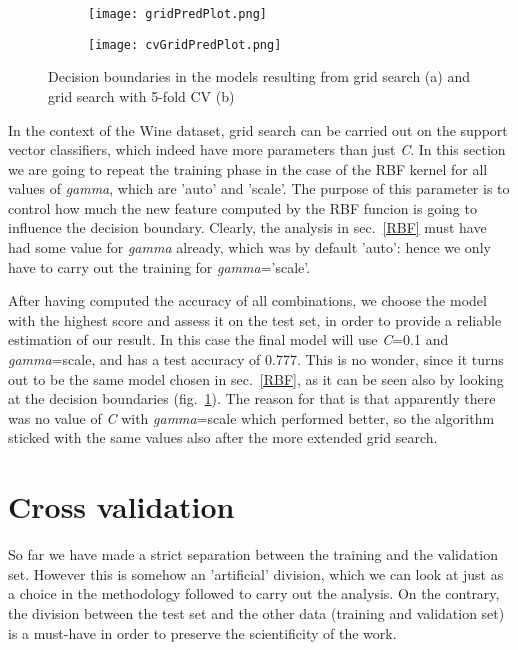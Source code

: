 \documentclass[11pt,twoside,a4paper]{article}
\begin{document}
\begin{figure}[!b]
    \begin{center}
    \begin{subfigure}{0.48\textwidth}
	\texttt{[image: gridPredPlot.png]}
        \caption{}
        \label{fig:gridPred}
    \end{subfigure}
    \hspace{\fill}
    \begin{subfigure}{0.48\textwidth}
	\texttt{[image: cvGridPredPlot.png]}
        \caption{}
        \label{fig:cvGridPred}
    \end{subfigure}
    \caption{Decision boundaries in the models resulting from grid search (a) and grid search with 5-fold CV (b)}
    \end{center}
\end{figure}

In the context of the Wine dataset, grid search can be carried out on the support vector classifiers, which indeed have more parameters than just \emph{C}. In this section we are going to repeat the training phase in the case of the RBF kernel for all values of \emph{gamma}, which are 'auto' and 'scale'. The purpose of this parameter is to control how much the new feature computed by the RBF funcion is going to influence the decision boundary. Clearly, the analysis in sec.~\ref{RBF} must have had some value for \emph{gamma} already, which was by default 'auto': hence we only have to carry out the training for \emph{gamma}='scale'.

After having computed the accuracy of all combinations, we choose the model with the highest score and assess it on the test set, in order to provide a reliable estimation of our result. In this case the final model will use \emph{C}=0.1 and \emph{gamma}=scale, and has a test accuracy of 0.777. This is no wonder, since it turns out to be the same model chosen in sec.~\ref{RBF}, as it can be seen also by looking at the decision boundaries (fig.~\ref{fig:gridPred}). The reason for that is that apparently there was no value of \emph{C} with \emph{gamma}=scale which performed better, so the algorithm sticked with the same values also after the more extended grid search.


\section{Cross validation}
\label{CV}
So far we have made a strict separation between the training and the validation set. However this is somehow an 'artificial' division, which we can look at just as a choice in the methodology followed to carry out the analysis. On the contrary, the division between the test set and the other data (training and validation set) is a must-have in order to preserve the scientificity of the work.
\end{document}
